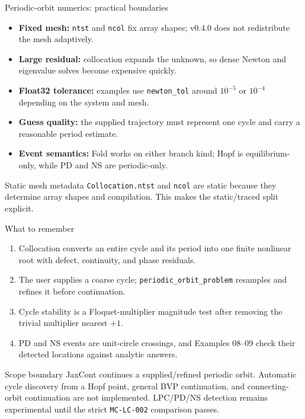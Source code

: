 \begin{frame}{Periodic-orbit numerics: practical boundaries}
\begin{itemize}
  \item \textbf{Fixed mesh:} \texttt{ntst} and \texttt{ncol} fix array shapes;
        v0.4.0 does not redistribute the mesh adaptively.
  \item \textbf{Large residual:} collocation expands the unknown, so dense
        Newton and eigenvalue solves become expensive quickly.
  \item \textbf{Float32 tolerance:} examples use \texttt{newton\_tol} around
        $10^{-5}$ or $10^{-4}$ depending on the system and mesh.
  \item \textbf{Guess quality:} the supplied trajectory must represent one
        cycle and carry a reasonable period estimate.
  \item \textbf{Event semantics:} Fold works on either branch kind; Hopf is
        equilibrium-only, while PD and NS are periodic-only.
\end{itemize}
\begin{block}{Static mesh metadata}
\texttt{Collocation.ntst} and \texttt{ncol} are static because they determine
array shapes and compilation. This makes the static/traced split explicit.
\end{block}
\end{frame}

\begin{frame}{What to remember}
\begin{enumerate}
  \item Collocation converts an entire cycle and its period into one finite
        nonlinear root with defect, continuity, and phase residuals.
  \item The user supplies a coarse cycle; \texttt{periodic\_orbit\_problem}
        resamples and refines it before continuation.
  \item Cycle stability is a Floquet-multiplier magnitude test after removing
        the trivial multiplier nearest $+1$.
  \item PD and NS events are unit-circle crossings, and Examples 08--09 check
        their detected locations against analytic answers.
\end{enumerate}
\vspace{3mm}
\begin{alertblock}{Scope boundary}
JaxCont continues a supplied/refined periodic orbit. Automatic cycle
discovery from a Hopf point, general BVP continuation, and connecting-orbit
continuation are not implemented. LPC/PD/NS detection remains experimental
until the strict \texttt{MC-LC-002} comparison passes.
\end{alertblock}
\end{frame}
